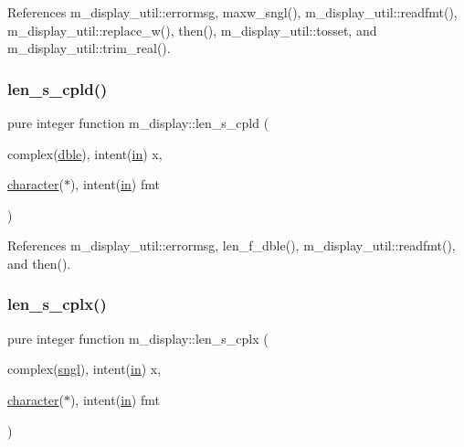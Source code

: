 References m\+\_\+display\+\_\+util\+::errormsg, maxw\+\_\+sngl(), m\+\_\+display\+\_\+util\+::readfmt(), m\+\_\+display\+\_\+util\+::replace\+\_\+w(), then(), m\+\_\+display\+\_\+util\+::tosset, and m\+\_\+display\+\_\+util\+::trim\+\_\+real().

\mbox{\label{namespacem__display_ace35690c2f36e28f07336cc7dcff47f4}} 
\subsubsection{\texorpdfstring{len\+\_\+s\+\_\+cpld()}{len\_s\_cpld()}}
{\footnotesize\ttfamily pure integer function m\+\_\+display\+::len\+\_\+s\+\_\+cpld (\begin{DoxyParamCaption}\item[{complex(\hyperlink{namespacem__display_a46d90b75b6ccef7ccade133e5847e815}{dble}), intent(\hyperlink{M__journal_83_8txt_afce72651d1eed785a2132bee863b2f38}{in})}]{x,  }\item[{\hyperlink{option__stopwatch_83_8txt_abd4b21fbbd175834027b5224bfe97e66}{character}($\ast$), intent(\hyperlink{M__journal_83_8txt_afce72651d1eed785a2132bee863b2f38}{in})}]{fmt }\end{DoxyParamCaption})\hspace{0.3cm}{\ttfamily [private]}}



References m\+\_\+display\+\_\+util\+::errormsg, len\+\_\+f\+\_\+dble(), m\+\_\+display\+\_\+util\+::readfmt(), and then().

\mbox{\label{namespacem__display_a7b573fb0cba7c7c954a820cdfe1c7968}} 
\subsubsection{\texorpdfstring{len\+\_\+s\+\_\+cplx()}{len\_s\_cplx()}}
{\footnotesize\ttfamily pure integer function m\+\_\+display\+::len\+\_\+s\+\_\+cplx (\begin{DoxyParamCaption}\item[{complex(\hyperlink{namespacem__display_a2ac86bc535c3ccc5947dbb3109c666b5}{sngl}), intent(\hyperlink{M__journal_83_8txt_afce72651d1eed785a2132bee863b2f38}{in})}]{x,  }\item[{\hyperlink{option__stopwatch_83_8txt_abd4b21fbbd175834027b5224bfe97e66}{character}($\ast$), intent(\hyperlink{M__journal_83_8txt_afce72651d1eed785a2132bee863b2f38}{in})}]{fmt }\end{DoxyParamCaption})\hspace{0.3cm}{\ttfamily [private]}}



